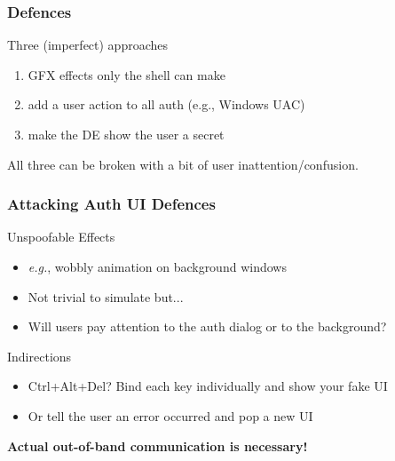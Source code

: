 \begin{frame}
\frametitle{Defences}

	\begin{block}{Three (imperfect) approaches}
		\begin{enumerate}[leftmargin=1.0em]
		\item[Unspoofability] GFX effects only the shell can make
		\item[Indirections] add a user action to all auth (e.g., Windows UAC)
		\item[Mutual Auth] make the DE show the user a secret
		\end{enumerate}
	\end{block}

	\begin{important}
	All three can be broken with a bit of user inattention/confusion.
	\end{important}
\end{frame}


\begin{frame}
\frametitle{Attacking Auth UI Defences}

	\begin{block}{Unspoofable Effects}
		\begin{itemize}
		\item \textit{e.g.}, wobbly animation on background windows
		\item Not trivial to simulate but...
		\item Will users pay attention to the auth dialog or to the background?
		\end{itemize}
	\end{block}

	\begin{block}{Indirections}
		\begin{itemize}
		\item Ctrl+Alt+Del? Bind each key individually and show your fake UI
		\item Or tell the user an error occurred and pop a new UI
		\end{itemize}
	\end{block}

	\textbf{Actual out-of-band communication is necessary!}
\end{frame}






